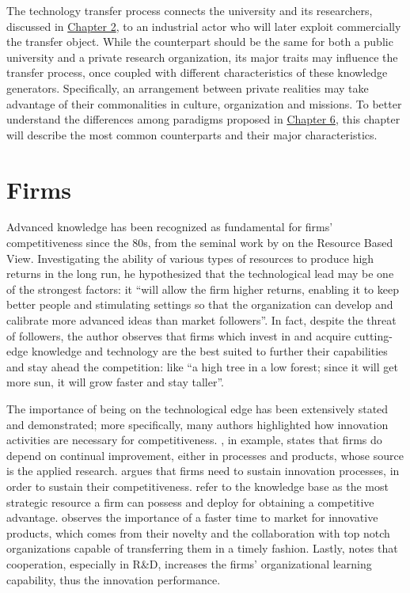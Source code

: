 

\label{Chapter3} %

The technology transfer process connects the university and its researchers, discussed in \hyperref[Chapter2]{Chapter 2}, to an industrial actor who will later exploit commercially the transfer object. While the counterpart should be the same for both a public university and a private research organization, its major traits may influence the transfer process, once coupled with different characteristics of these knowledge generators. Specifically, an arrangement between private realities may take advantage of their commonalities in culture, organization and missions. To better understand the differences among paradigms proposed in \hyperref[Chapter6]{Chapter 6}, this chapter will describe the most common counterparts and their major characteristics.

\section{Firms}

Advanced knowledge has been recognized as fundamental for firms' competitiveness since the 80s, from the seminal work by \citet{Wernerfelt1984} on the Resource Based View. Investigating the ability of various types of resources to produce high returns in the long run, he hypothesized that the technological lead may be one of the strongest factors: it \enquote{will allow the firm higher returns, enabling it to keep better people and stimulating settings so that the organization can develop and calibrate more advanced ideas than market followers}. In fact, despite the threat of followers, the author observes that firms which invest in and acquire cutting-edge knowledge and technology are the best suited to further their capabilities and stay ahead the competition: like \enquote{a high tree in a low forest; since it will get more sun, it will grow faster and stay taller}.

The importance of being on the technological edge has been extensively stated and demonstrated; more specifically, many authors highlighted how innovation activities are necessary for competitiveness. \citet{Beath2000}, in example, states that firms do depend on continual improvement, either in processes and products, whose source is the applied research. \citet{Yusuf2008} argues that firms need to sustain innovation processes, in order to sustain their competitiveness. \citet{Jimenez2011} refer to the knowledge base as the most strategic resource a firm can possess and deploy for obtaining a competitive advantage. \citet{Siegel2003a} observes the importance of a faster time to market for innovative products, which comes from their novelty and the collaboration with top notch organizations capable of transferring them in a timely fashion. Lastly, \citet{AzagraCaro2010} notes that cooperation, especially in R\&D, increases the firms' organizational learning capability, thus the innovation performance. 

